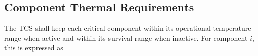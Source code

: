 








\subsection{Component Thermal Requirements}
\label{sec:component_thermal_requirements}
The TCS shall keep each critical component within its operational temperature range when active and within its survival range when inactive. For component \(i\), this is expressed as

